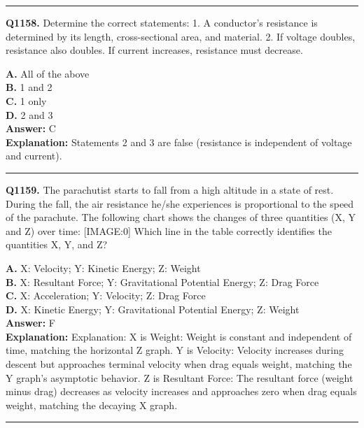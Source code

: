 \documentclass[12pt]{article}
\begin{document}
\hrule
\vspace{1em}


\noindent
\textbf{Q1158.} Determine the correct statements:
1.
A conductor’s resistance is determined by its length, cross-sectional area, and material.
2.
If voltage doubles, resistance also doubles.
If current increases, resistance must decrease.



\textbf{A.} All of the above \\
\textbf{B.} 1 and 2 \\
\textbf{C.} 1 only \\
\textbf{D.} 2 and 3 \\

\textbf{Answer:} C \\
\textbf{Explanation:} Statements 2 and 3 are false (resistance is independent of voltage and current).

\hrule
\vspace{1em}


\noindent
\textbf{Q1159.} The parachutist starts to fall from a high altitude in a state of rest. During the fall, the air resistance he/she experiences is proportional to the speed of the parachute. The following chart shows the changes of three quantities (X, Y and Z) over time:
[IMAGE:0]
Which line in the table correctly identifies the quantities X, Y, and Z?



\textbf{A.} X: Velocity; Y: Kinetic Energy; Z: Weight \\
\textbf{B.} X: Resultant Force; Y: Gravitational Potential Energy; Z: Drag Force \\
\textbf{C.} X: Acceleration; Y: Velocity; Z: Drag Force \\
\textbf{D.} X: Kinetic Energy; Y: Gravitational Potential Energy; Z: Weight \\

\textbf{Answer:} F \\
\textbf{Explanation:} Explanation:
X is Weight: Weight is constant and independent of time, matching the horizontal Z graph.
Y is Velocity: Velocity increases during descent but approaches terminal velocity when drag equals weight, matching the Y graph's asymptotic behavior.
Z is Resultant Force: The resultant force (weight minus drag) decreases as velocity increases and approaches zero when drag equals weight, matching the decaying X graph.

\hrule
\vspace{1em}
\end{document}
